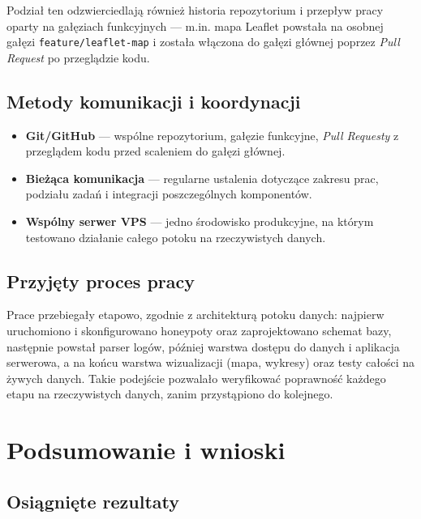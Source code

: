 \documentclass[12pt,a4paper]{report}
\begin{document}
Podział ten odzwierciedlają również historia repozytorium i przepływ pracy
oparty na gałęziach funkcyjnych --- m.in. mapa Leaflet powstała na osobnej
gałęzi \texttt{feature/leaflet-map} i została włączona do gałęzi głównej poprzez
\emph{Pull Request} po przeglądzie kodu.

\section{Metody komunikacji i koordynacji}

\begin{itemize}
  \item \textbf{Git/GitHub} --- wspólne repozytorium, gałęzie funkcyjne,
        \emph{Pull Requesty} z przeglądem kodu przed scaleniem do gałęzi głównej.
  \item \textbf{Bieżąca komunikacja} --- regularne ustalenia dotyczące zakresu
        prac, podziału zadań i integracji poszczególnych komponentów.
  \item \textbf{Wspólny serwer VPS} --- jedno środowisko produkcyjne, na którym
        testowano działanie całego potoku na rzeczywistych danych.
\end{itemize}

\section{Przyjęty proces pracy}

Prace przebiegały etapowo, zgodnie z architekturą potoku danych: najpierw
uruchomiono i skonfigurowano honeypoty oraz zaprojektowano schemat bazy,
następnie powstał parser logów, później warstwa dostępu do danych i aplikacja
serwerowa, a na końcu warstwa wizualizacji (mapa, wykresy) oraz testy całości
na żywych danych. Takie podejście pozwalało weryfikować poprawność każdego etapu
na rzeczywistych danych, zanim przystąpiono do kolejnego.

\chapter{Podsumowanie i wnioski}
\label{ch:summary}

\section{Osiągnięte rezultaty}
\end{document}
